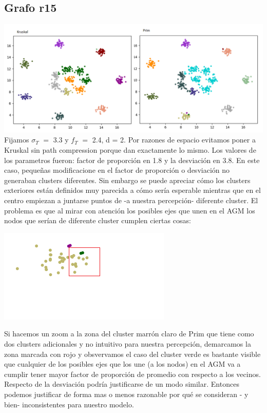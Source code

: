 \documentclass[11pt,a4paper]{article}
\begin{document}
\subsection{Grafo r15}
\includegraphics[scale=.5]{graficos/r15.png}
 Fijamos $\sigma_{T}$ $=$ 3.3 y $f_{T}$ $=$ 2.4, d = 2. Por razones de espacio evitamos poner a Kruskal sin path compression porque dan exactamente lo mismo.
 Los valores de los parametros fueron: factor de proporción en 1.8 y la desviación en 3.8. En este caso, pequeñas modificacione en el factor de proporción o desviación no generaban clusters diferentes. Sin embargo se puede apreciar cómo los clusters exteriores están definidos muy parecida a cómo sería esperable mientras que en el centro empiezan a juntarse puntos de -a nuestra percepción- diferente cluster. El problema es que al mirar con atención los posibles ejes que unen en el AGM los nodos que serían de diferente cluster cumplen ciertas cosas:
\begin{center}
 \includegraphics[scale=.7]{graficos/r15_zoom.png} 
 
\end{center}
Si hacemos un zoom a la zona del cluster marrón claro de Prim que tiene como dos clusters adicionales y no intuitivo para nuestra percepción, demarcamos la zona marcada con rojo y obsvervamos el caso del cluster verde es bastante visible que cualquier de los posibles ejes que los une (a los nodos) en el AGM va a cumplir tener mayor factor de proporción de promedio con respecto a los vecinos. Respecto de la desviación podría justificarse de un modo similar. Entonces podemos justificar de forma mas o menos razonable por qué se consideran - y bien- inconsistentes para nuestro modelo.
\end{document}
